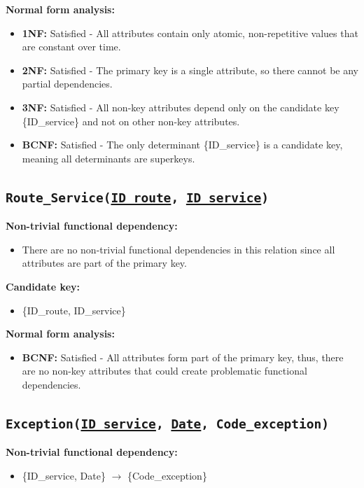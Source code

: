 \documentclass[a4paper, 12pt]{article}
\begin{document}
\textbf{Normal form analysis:}
\begin{itemize}
    \item \textbf{1NF:} Satisfied - All attributes contain only atomic, non-repetitive values that are constant over time.
    
    \item \textbf{2NF:} Satisfied - The primary key is a single attribute, so there cannot be any partial dependencies.
    
    \item \textbf{3NF:} Satisfied - All non-key attributes depend only on the candidate key \{ID\_service\} and not on other non-key attributes.
    
    \item \textbf{BCNF:} Satisfied - The only determinant \{ID\_service\} is a candidate key, meaning all determinants are superkeys.
\end{itemize}

\subsection{\texttt{{Route\_Service}(\underline{ID\_route}, \underline{ID\_service})}}
\textbf{Non-trivial functional dependency:}
\begin{itemize}
    \item There are no non-trivial functional dependencies in this relation since all attributes are part of the primary key.
\end{itemize}
\textbf{Candidate key:}
\begin{itemize}
    \item \{ID\_route, ID\_service\}
\end{itemize}

\textbf{Normal form analysis:}
\begin{itemize}
    \item \textbf{BCNF:} Satisfied -  All attributes form part of the primary key, thus, there are no non-key attributes that could create problematic functional dependencies.
\end{itemize}
\subsection{\texttt{{Exception}(\underline{ID\_service}, \underline{Date}, Code\_exception)}}
\textbf{Non-trivial functional dependency:}
\begin{itemize}
    \item \{ID\_service, Date\} $\rightarrow$ \{Code\_exception\}
\end{itemize}
\end{document}
